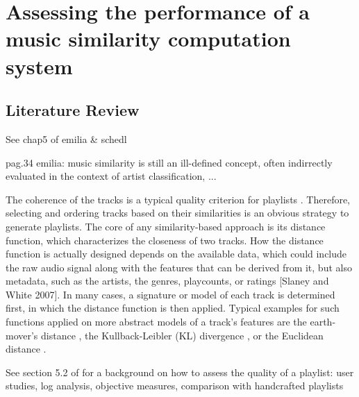\chapter{Assessing the performance of a music similarity computation system} 

\label{Chapter3} 


\section{Literature Review}

See chap5 of emilia & schedl

pag.34 emilia: music similarity is still an ill-defined concept, often indirrectly evaluated in the context of artist classification, ...

The coherence of the tracks is a typical quality criterion for playlists \cite{logan04}. 
Therefore, selecting and ordering tracks based on their similarities is an obvious strategy to generate playlists. The core of any similarity-based approach is its distance function, which characterizes the closeness of two tracks. How the distance function is actually designed depends on the available data, which could include the raw audio signal along with the features that can be derived from it, but also metadata, such as the artists, the genres, playcounts, or ratings [Slaney and White 2007]. In many cases, a signature or model of each track is determined first, in which the distance function is then applied. Typical examples for such functions applied on more abstract models of a track’s features are the earth-mover’s distance \cite{logan04}, the Kullback-Leibler (KL) divergence \cite{vignoli05}, or the Euclidean distance \cite{knees06}.

See section 5.2 of \cite{bonnin14} for a background on how to assess the quality of a playlist: user studies, log analysis, objective measures, comparison with handcrafted playlists


